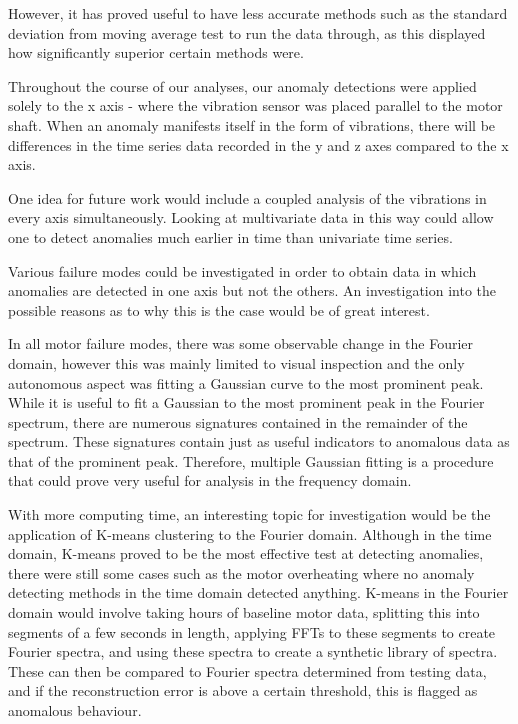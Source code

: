 However, it has proved useful to have less accurate methods such as the standard deviation from moving average test to run the data through, as this displayed how significantly superior certain methods were.

Throughout the course of our analyses, our anomaly detections were applied solely to the x axis - where the vibration sensor was placed parallel to the motor shaft. When an anomaly manifests itself in the form of vibrations, there will be differences in the time series data recorded in the y and z axes compared to the x axis.

One idea for future work would include a coupled analysis of the vibrations in every axis simultaneously. Looking at multivariate data in this way could allow one to detect anomalies much earlier in time than univariate time series.

Various failure modes could be investigated in order to obtain data in which anomalies are detected in one axis but not the others. An investigation into the possible reasons as to why this is the case would be of great interest.


In all motor failure modes, there was some observable change in the Fourier domain, however this was mainly limited to visual inspection and the only autonomous aspect was fitting a Gaussian curve to the most prominent peak. While it is useful to fit a Gaussian to the most prominent peak in the Fourier spectrum, there are numerous signatures contained in the remainder of the spectrum. These signatures contain just as useful indicators to anomalous data as that of the prominent peak. Therefore, multiple Gaussian fitting is a procedure that could prove very useful for analysis in the frequency domain.

With more computing time, an interesting topic for investigation would be the application of K-means clustering to the Fourier domain. Although in the time domain, K-means proved to be the most effective test at detecting anomalies, there were still some cases such as the motor overheating where no anomaly detecting methods in the time domain detected anything. K-means in the Fourier domain would involve taking hours of baseline motor data, splitting this into segments of a few seconds in length, applying FFTs to these segments to create Fourier spectra, and using these spectra to create a synthetic library of spectra. These can then be compared to Fourier spectra determined from testing data, and if the reconstruction error is above a certain threshold, this is flagged as anomalous behaviour.


